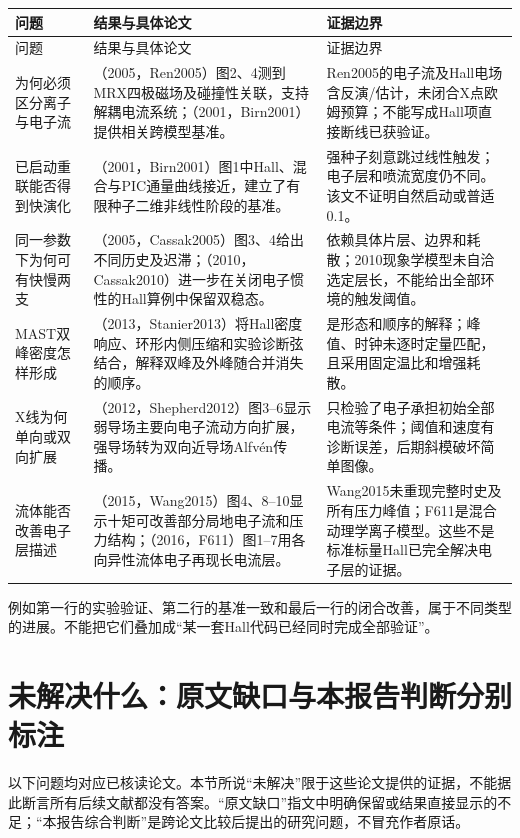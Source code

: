 \documentclass[UTF8,a4paper,11pt,openany,fontset=fandol]{ctexbook}
\begin{document}
\begin{longtable}{P{29mm}P{63mm}P{56mm}}
\toprule 问题 & 结果与具体论文 & 证据边界\\\midrule\endfirsthead
\toprule 问题 & 结果与具体论文 & 证据边界\\\midrule\endhead
为何必须区分离子与电子流 &
\citet{Ren2005}（2005，Ren2005）图2、4测到MRX四极磁场及碰撞性关联，支持解耦电流系统；\citet{Birn2001}（2001，Birn2001）提供相关跨模型基准。 &
Ren2005的电子流及Hall电场含反演/估计，未闭合X点欧姆预算；不能写成Hall项直接断线已获验证。\\
已启动重联能否得到快演化 &
\citet{Birn2001}（2001，Birn2001）图1中Hall、混合与PIC通量曲线接近，建立了有限种子二维非线性阶段的基准。 &
强种子刻意跳过线性触发；电子层和喷流宽度仍不同。该文不证明自然启动或普适0.1。\\
同一参数下为何可有快慢两支 &
\citet{Cassak2005}（2005，Cassak2005）图3、4给出不同历史及迟滞；\citet{Cassak2010}（2010，Cassak2010）进一步在关闭电子惯性的Hall算例中保留双稳态。 &
依赖具体片层、边界和耗散；2010现象学模型未自洽选定层长，不能给出全部环境的触发阈值。\\
MAST双峰密度怎样形成 &
\citet{Stanier2013}（2013，Stanier2013）将Hall密度响应、环形内侧压缩和实验诊断弦结合，解释双峰及外峰随合并消失的顺序。 &
是形态和顺序的解释；峰值、时钟未逐时定量匹配，且采用固定温比和增强耗散。\\
X线为何单向或双向扩展 &
\citet{Shepherd2012}（2012，Shepherd2012）图3--6显示弱导场主要向电子流动方向扩展，强导场转为双向近导场Alfvén传播。 &
只检验了电子承担初始全部电流等条件；阈值和速度有诊断误差，后期斜模破坏简单图像。\\
流体能否改善电子层描述 &
\citet{Wang2015}（2015，Wang2015）图4、8--10显示十矩可改善部分局地电子流和压力结构；\citet{F611}（2016，F611）图1--7用各向异性流体电子再现长电流层。 &
Wang2015未重现完整时史及所有压力峰值；F611是混合动理学离子模型。这些不是标准标量Hall已完全解决电子层的证据。\\
\bottomrule
\end{longtable}

例如第一行的实验验证、第二行的基准一致和最后一行的闭合改善，属于不同类型的进展。不能把它们叠加成“某一套Hall代码已经同时完成全部验证”。

\section{未解决什么：原文缺口与本报告判断分别标注}
\label{sec:guide-unsolved}
以下问题均对应已核读论文。本节所说“未解决”限于这些论文提供的证据，不能据此断言所有后续文献都没有答案。“原文缺口”指文中明确保留或结果直接显示的不足；“本报告综合判断”是跨论文比较后提出的研究问题，不冒充作者原话。
\end{document}

